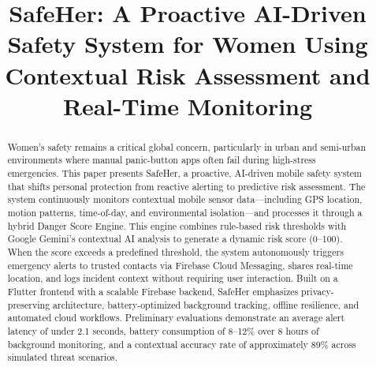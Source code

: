 \documentclass[conference,twocolumn]{IEEEtran}
\begin{document}
\title{SafeHer: A Proactive AI-Driven Safety System for Women Using Contextual Risk Assessment and Real-Time Monitoring}

\author{
}

\maketitle

\begin{abstract}
Women's safety remains a critical global concern, particularly in urban and semi-urban environments where manual panic-button apps often fail during high-stress emergencies. This paper presents SafeHer, a proactive, AI-driven mobile safety system that shifts personal protection from reactive alerting to predictive risk assessment. The system continuously monitors contextual mobile sensor data---including GPS location, motion patterns, time-of-day, and environmental isolation---and processes it through a hybrid Danger Score Engine. This engine combines rule-based risk thresholds with Google Gemini's contextual AI analysis to generate a dynamic risk score (0--100). When the score exceeds a predefined threshold, the system autonomously triggers emergency alerts to trusted contacts via Firebase Cloud Messaging, shares real-time location, and logs incident context without requiring user interaction. Built on a Flutter frontend with a scalable Firebase backend, SafeHer emphasizes privacy-preserving architecture, battery-optimized background tracking, offline resilience, and automated cloud workflows. Preliminary evaluations demonstrate an average alert latency of under 2.1 seconds, battery consumption of 8--12\% over 8 hours of background monitoring, and a contextual accuracy rate of approximately 89\% across simulated threat scenarios.
\end{abstract}
\end{document}
